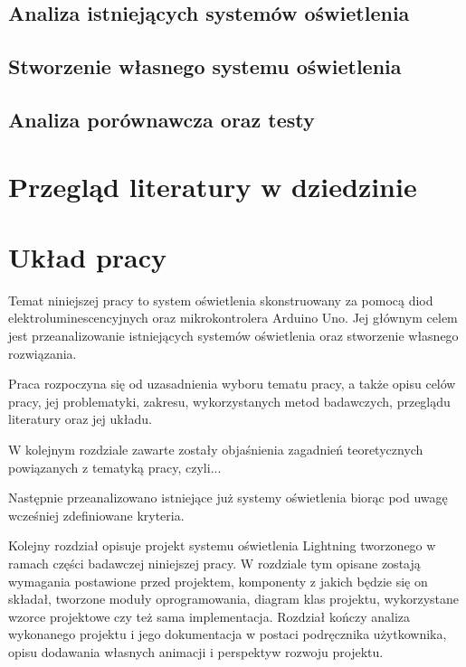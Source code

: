 \documentclass[12pt]{report}
\begin{document}

\subsection{Analiza istniejących systemów oświetlenia}


\subsection{Stworzenie własnego systemu oświetlenia}


\subsection{Analiza porównawcza oraz testy}


\section{Przegląd literatury w dziedzinie}


\section{Układ pracy}

Temat niniejszej pracy to system oświetlenia skonstruowany za pomocą diod elektroluminescencyjnych oraz mikrokontrolera Arduino Uno. Jej głównym celem jest przeanalizowanie istniejących systemów oświetlenia oraz stworzenie własnego ro\-związania.

Praca rozpoczyna się od uzasadnienia wyboru tematu pracy, a także opisu celów pracy, jej problematyki, zakresu, wykorzystanych metod badawczych, przeglądu literatury oraz jej układu.

W kolejnym rozdziale zawarte zostały objaśnienia zagadnień teoretycznych po\-wiązanych z tematyką pracy, czyli...


Następnie przeanalizowano istniejące już systemy oświetlenia biorąc pod uwagę wcześniej zdefiniowane kryteria.

Kolejny rozdział opisuje projekt systemu oświetlenia Lightning tworzonego w ramach części badawczej niniejszej pracy. W rozdziale tym opisane zostają wymagania postawione przed projektem, komponenty z jakich będzie się on składał, tworzone moduły oprogramowania, diagram klas projektu, wykorzystane wzorce projektowe czy też sama implementacja. Rozdział kończy analiza wykonanego projektu i jego dokumentacja w postaci podręcznika użytkownika, opisu dodawania własnych animacji i perspektyw rozwoju projektu.
\end{document}
